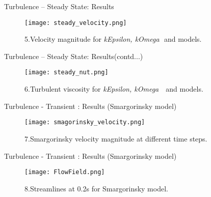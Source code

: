 \documentclass [xcolor=svgnames, t] {beamer}
\begin{document}
\begin{frame}{Turbulence – Steady State: Results}

\begin{figure}
    \centering
    \texttt{[image: steady\_velocity.png]}
    \caption{5.Velocity magnitude for \textit{kEpsilon, kOmega} \,\,and  models.}
\end{figure}
    
\end{frame}

\begin{frame}{Turbulence – Steady State: Results(contd...)}

\begin{figure}
    \centering
   \texttt{[image: steady\_nut.png]}
    \caption{6.Turbulent viscosity for \textit{kEpsilon, kOmega}  \,\, and  models.}
\end{figure}
    
\end{frame}


\begin{frame}{Turbulence - Transient : Results (Smargorinsky model)}
 \begin{figure}
    \centering
    \texttt{[image: smagorinsky\_velocity.png]}
    \caption{7.Smargorinsky velocity magnitude at different time steps.}
\end{figure}
       
\end{frame}

\begin{frame}{Turbulence - Transient : Results (Smargorinsky model)}
 \begin{figure}
    \centering
    \texttt{[image: FlowField.png]}
    \caption{8.Streamlines at 0.2s for Smargorinsky model.}
\end{figure}
       
\end{frame}



\end{document}
